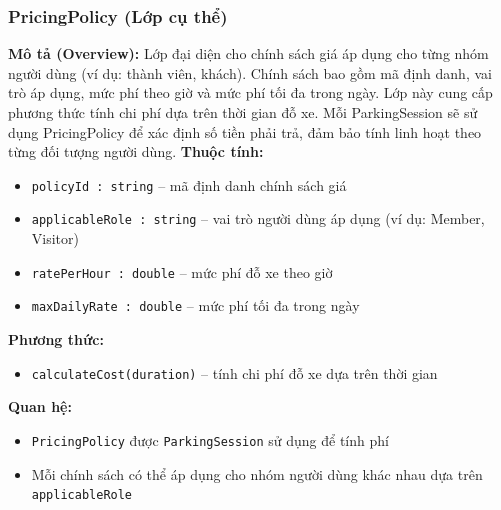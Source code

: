 \subsubsection{PricingPolicy (Lớp cụ thể)}
\textbf{Mô tả (Overview):} Lớp đại diện cho chính sách giá áp dụng cho từng nhóm người dùng (ví dụ: thành viên, khách). Chính sách bao gồm mã định danh, vai trò áp dụng, mức phí theo giờ và mức phí tối đa trong ngày. Lớp này cung cấp phương thức tính chi phí dựa trên thời gian đỗ xe. Mỗi ParkingSession sẽ sử dụng PricingPolicy để xác định số tiền phải trả, đảm bảo tính linh hoạt theo từng đối tượng người dùng.
\textbf{Thuộc tính:}
\begin{itemize}[noitemsep]
  \item \texttt{policyId : string} -- mã định danh chính sách giá
  \item \texttt{applicableRole : string} -- vai trò người dùng áp dụng (ví dụ: Member, Visitor)
  \item \texttt{ratePerHour : double} -- mức phí đỗ xe theo giờ
  \item \texttt{maxDailyRate : double} -- mức phí tối đa trong ngày
\end{itemize}

\textbf{Phương thức:}
\begin{itemize}[noitemsep]
  \item \texttt{calculateCost(duration)} -- tính chi phí đỗ xe dựa trên thời gian
\end{itemize}

\textbf{Quan hệ:}
\begin{itemize}[noitemsep]
  \item \texttt{PricingPolicy} được \texttt{ParkingSession} sử dụng để tính phí
  \item Mỗi chính sách có thể áp dụng cho nhóm người dùng khác nhau dựa trên \texttt{applicableRole}
\end{itemize}
